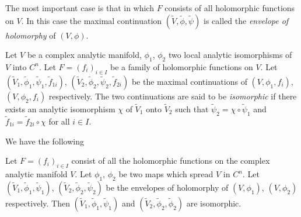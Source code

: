 The most important case is that in which $F$ consists of all
holomorphic functions on $V$. In this case the maximal continuation
$(\tilde{V}, \tilde{\phi}, \tilde{\psi})$ is called the
\textit{envelope of holomorphy} of $(V, \phi)$. 

Let $V$ be a complex analytic manifold, $\phi_1$, $\phi_2$ two local
analytic isomorphisms of $V$ into $C^n$. Let $F = (f_i)_{i \in I}$ be
a family of holomorphic functions on $V$. Let $(\tilde{V}_1,
\tilde{\phi}_1, \tilde{\psi}_1, \tilde{f}_{1i})$, $(\tilde{V}_2,
\tilde{\phi}_2, \tilde{\psi}_2, \tilde{f}_{2i})$ be the maximal
continuations of $(V, \phi_1, f_i)$, $(V, \phi_2, f_i)$
respectively. The two continuations are said to be \textit{isomorphic}
if there exists an analytic isomorphism $\chi$ of $\tilde{V}_1$ onto
$\tilde{V}_2$ such that $\tilde{\psi}_2 = \chi \circ \tilde{\psi}_1$
and $\tilde{f}_{1i} = \tilde{f}_{2i} \circ \chi$ for all $i \in I$. 

We have the following 

\setcounter{thm}{0}
\begin{thm}\label{chap5:thm1}
Let $F = (f_i)_{i \in I}$ consist of all the holomorphic functions on
the complex analytic manifold $V$. Let $\phi_1$, $\phi_2$ be two maps
which spread $V$ in $C^n$. Let $(\tilde{V}_1, \tilde{\phi}_1,
\tilde{\psi}_1)$, $(\tilde{V}_2, \tilde{\phi}_2, \tilde{\psi}_2)$ be
the envelopes of holomorphy of $(V, \phi_1)$, $(V, \phi_2)$
respectively. Then $(\tilde{V}_1, \tilde{\phi}_1, \tilde{\psi}_1)$ and
$(\tilde{V}_2, \tilde{\phi}_2, \tilde{\phi}_2)$ are isomorphic.
\end{thm}

